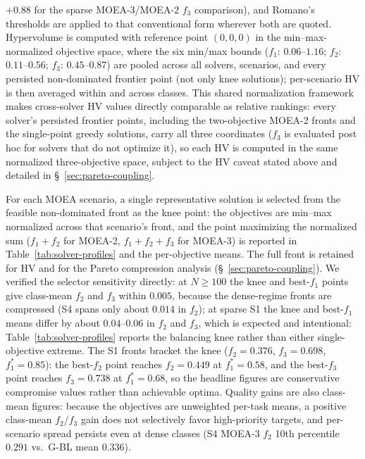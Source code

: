 \documentclass[preprint,12pt,authoryear]{elsarticle}
\begin{document}
$+0.88$ for the sparse MOEA-3/MOEA-2 $f_3$ comparison), and Romano's
thresholds are applied to that conventional form wherever both are quoted.
Hypervolume is computed with reference point $(0, 0, 0)$ in the
min--max-normalized objective space, where the six min/max bounds
($f_1$: $0.06$--$1.16$; $f_2$: $0.11$--$0.56$; $f_3$: $0.45$--$0.87$) are
pooled across all solvers, scenarios, and every persisted non-dominated
frontier point (not only knee solutions); per-scenario HV is then averaged
within and across classes.
This shared normalization framework makes cross-solver HV values directly
comparable as relative rankings: every solver's persisted frontier
points, including the two-objective MOEA-2 fronts and the single-point
greedy solutions, carry all three coordinates ($f_3$ is evaluated post hoc
for solvers that do not optimize it), so each HV is computed in the same
normalized three-objective space, subject to the HV caveat stated
above and detailed in \S~\ref{sec:pareto-coupling}.

For each MOEA scenario, a single representative solution is selected from the
feasible non-dominated front as the knee point: the objectives are min--max
normalized across that scenario's front, and the point maximizing the normalized
sum ($f_1+f_2$ for MOEA-2, $f_1+f_2+f_3$ for MOEA-3) is reported in
Table~\ref{tab:solver-profiles} and the per-objective means. The full front is
retained for HV and for the Pareto compression analysis
(\S~\ref{sec:pareto-coupling}). We verified the selector sensitivity
directly: at $N\geq100$ the knee and best-$f_1$ points give class-mean $f_2$
and $f_3$ within $0.005$, because the dense-regime fronts are compressed
(S4 spans only about $0.014$ in $f_2$); at sparse S1 the knee and best-$f_1$
means differ by about $0.04$--$0.06$ in $f_2$ and $f_3$, which is expected and
intentional: Table~\ref{tab:solver-profiles} reports the balancing knee
rather than either single-objective extreme. The S1 fronts bracket the knee
($f_2 = 0.376$, $f_3 = 0.698$, $f_1^* = 0.85$): the best-$f_2$ point reaches
$f_2 = 0.449$ at $f_1^* = 0.58$, and the best-$f_3$ point reaches
$f_3 = 0.738$ at $f_1^* = 0.68$, so the headline figures are conservative
compromise values rather than achievable optima. Quality gains are also
class-mean figures: because the objectives are unweighted per-task means,
a positive class-mean $f_2$/$f_3$ gain does not selectively favor
high-priority targets, and per-scenario spread persists even at dense
classes (S4 MOEA-3 $f_2$ 10th percentile $0.291$ vs.\ G-BL mean $0.336$).
\end{document}
